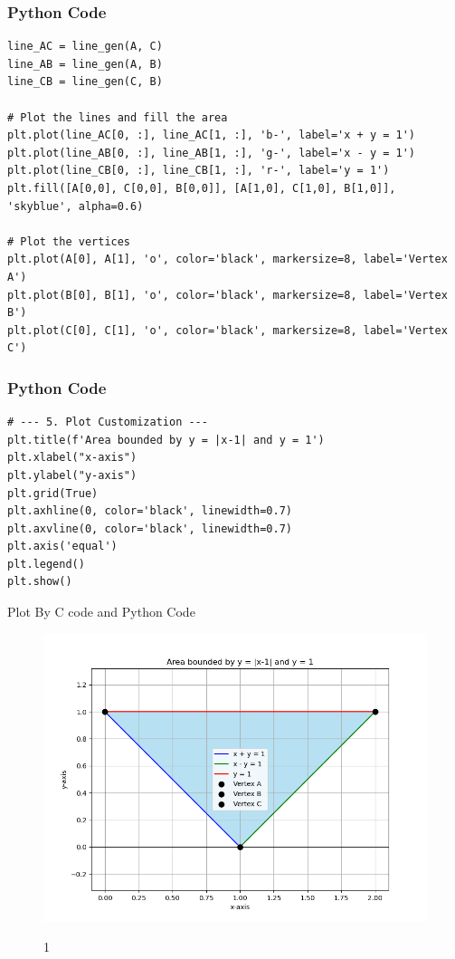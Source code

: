 \documentclass{beamer}
\begin{document}
\begin{frame}[fragile]
\frametitle{Python Code}
\begin{lstlisting}
line_AC = line_gen(A, C)
line_AB = line_gen(A, B)
line_CB = line_gen(C, B)

# Plot the lines and fill the area
plt.plot(line_AC[0, :], line_AC[1, :], 'b-', label='x + y = 1')
plt.plot(line_AB[0, :], line_AB[1, :], 'g-', label='x - y = 1')
plt.plot(line_CB[0, :], line_CB[1, :], 'r-', label='y = 1')
plt.fill([A[0,0], C[0,0], B[0,0]], [A[1,0], C[1,0], B[1,0]], 'skyblue', alpha=0.6)

# Plot the vertices
plt.plot(A[0], A[1], 'o', color='black', markersize=8, label='Vertex A')
plt.plot(B[0], B[1], 'o', color='black', markersize=8, label='Vertex B')
plt.plot(C[0], C[1], 'o', color='black', markersize=8, label='Vertex C')
\end{lstlisting}    
\end{frame}
\begin{frame}[fragile]
\frametitle{Python Code}
\begin{lstlisting}
# --- 5. Plot Customization ---
plt.title(f'Area bounded by y = |x-1| and y = 1')
plt.xlabel("x-axis")
plt.ylabel("y-axis")
plt.grid(True)
plt.axhline(0, color='black', linewidth=0.7)
plt.axvline(0, color='black', linewidth=0.7)
plt.axis('equal')
plt.legend()
plt.show()
\end{lstlisting}
\end{frame}
\begin{frame}{Plot By C code and Python Code}
    \begin{figure}
    \centering
    \includegraphics[width=0.7\columnwidth]{figs/Figure_1.png}
    \label{fig:placeholder}
    \caption{1}
\end{figure}
\end{frame}
\end{document}
